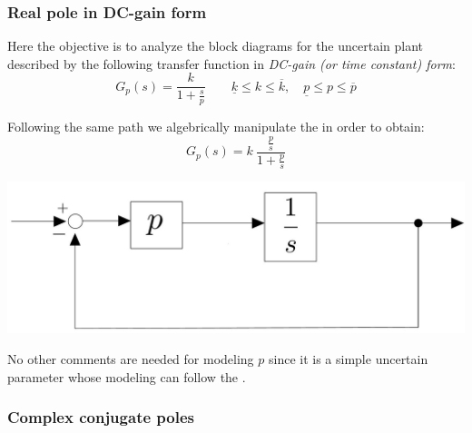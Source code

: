 \documentclass[a4paper, 12pt]{article}
\begin{document}
\subsubsection{Real pole in DC-gain form}
Here the objective is to analyze the block diagrams for the uncertain plant described by the following transfer function in \textit{DC-gain (or time constant) form}:
\begin{equation}\label{eq:ex2}
    G_p(s)=\frac{k}{1+\frac{s}{p}} \qquad
    \underline{k}\le {k} \le \overline{k}, \quad
    \underline{p}\le {p} \le \overline{p}
\end{equation}
\noindent

\begin{multicols}{2}
    \noindent
    Following the same path we algebrically manipulate the  in order to obtain:
    \begin{equation*}
        G_p(s)=k \ \frac{\frac{p}{s}}{1+\frac{p}{s}}
    \end{equation*}
    \newcolumn
    \begin{center}
        \includegraphics[scale=0.15]{img/ex2.jpg}
    \end{center}
\end{multicols}
\noindent
No other comments are needed  for modeling $p$ since it is a simple uncertain parameter whose modeling can follow the .


\subsubsection{Complex conjugate poles}
\end{document}
